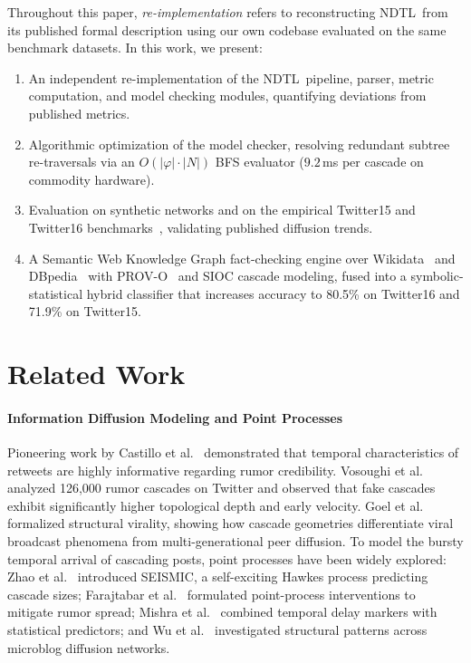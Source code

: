 \documentclass[10pt,twocolumn,a4paper]{article}
\newcommand{\NDTL}{\textsc{NDTL}}
\begin{document}
Throughout this paper, \emph{re-implementation} refers to reconstructing \NDTL\ from its published formal description using our own codebase evaluated on the same benchmark datasets. In this work, we present:
\begin{enumerate}
  \item An independent re-implementation of the \NDTL\ pipeline, parser, metric computation, and model checking modules, quantifying deviations from published metrics.
  \item Algorithmic optimization of the model checker, resolving redundant subtree re-traversals via an $O(|\varphi| \cdot |N|)$ BFS evaluator ($9.2$\,ms per cascade on commodity hardware).
  \item Evaluation on synthetic networks and on the empirical Twitter15 and Twitter16 benchmarks~\cite{ma2016, ma2017}, validating published diffusion trends.
  \item A Semantic Web Knowledge Graph fact-checking engine over Wikidata~\cite{vrandecic2014} and DBpedia~\cite{lehmann2015} with PROV-O~\cite{lebo2013} and SIOC cascade modeling, fused into a symbolic-statistical hybrid classifier that increases accuracy to 80.5\% on Twitter16 and 71.9\% on Twitter15.
\end{enumerate}

\section{Related Work}
\paragraph{Information Diffusion Modeling and Point Processes}
Pioneering work by Castillo et al.~\cite{castillo2011} demonstrated that temporal characteristics of retweets are highly informative regarding rumor credibility. Vosoughi et al.~\cite{vosoughi2018} analyzed 126,000 rumor cascades on Twitter and observed that fake cascades exhibit significantly higher topological depth and early velocity. Goel et al.~\cite{goel2015structural} formalized structural virality, showing how cascade geometries differentiate viral broadcast phenomena from multi-generational peer diffusion. To model the bursty temporal arrival of cascading posts, point processes have been widely explored: Zhao et al.~\cite{zhao2015seismic} introduced SEISMIC, a self-exciting Hawkes process predicting cascade sizes; Farajtabar et al.~\cite{farajtabar2017fake} formulated point-process interventions to mitigate rumor spread; Mishra et al.~\cite{mishra2016feature} combined temporal delay markers with statistical predictors; and Wu et al.~\cite{wu2015weibo} investigated structural patterns across microblog diffusion networks.
\end{document}
